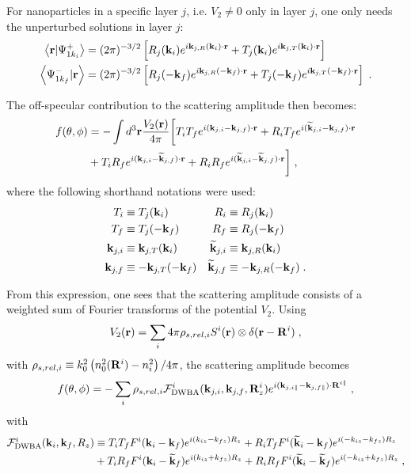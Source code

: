 For nanoparticles in a specific layer $j$, i.e. $V_2\neq0$ only in layer $j$, one only needs the unperturbed solutions in layer $j$:
\begin{align*}
  \left\langle \mathbf{r} \vert \Psi^+_{1k_i} \right\rangle &= (2\pi)^{-3/2}\left[ R_j(\mathbf{k}_i) e^{i \mathbf{k}_{j,R}(\mathbf{k}_i)\cdot\mathbf{r}} + T_j(\mathbf{k}_i) e^{i \mathbf{k}_{j,T}(\mathbf{k}_i)\cdot\mathbf{r}} \right] \\
  \left\langle \Psi^-_{1k_f} \vert \mathbf{r} \right\rangle &= (2\pi)^{-3/2}\left[ R_j(-\mathbf{k}_f) e^{i \mathbf{k}_{j,R}(-\mathbf{k}_f)\cdot\mathbf{r}} + T_j(-\mathbf{k}_f) e^{i \mathbf{k}_{j,T}(-\mathbf{k}_f)\cdot\mathbf{r}} \right] \; .
\end{align*}

The off-specular contribution to the scattering amplitude then becomes:
\begin{align*}
  f(\theta, \phi) &= -\int d^3\mathbf{r} \frac{V_2(\mathbf{r})}{4\pi} \biggl[ T_iT_fe^{i(\mathbf{k}_{j,i}-\mathbf{k}_{j,f})\cdot\mathbf{r}} + R_iT_fe^{i(\mathbf{\widetilde{k}}_{j,i}-\mathbf{k}_{j,f})\cdot\mathbf{r}} \\
   & + T_iR_fe^{i(\mathbf{k}_{j,i}-\mathbf{\widetilde{k}}_{j,f})\cdot\mathbf{r}} + R_iR_fe^{i(\mathbf{\widetilde{k}}_{j,i}-\mathbf{\widetilde{k}}_{j,f})\cdot\mathbf{r}} \biggr] \; ,
\end{align*}
where the following shorthand notations were used:
\begin{align*}
  T_i &\equiv  T_j(\mathbf{k}_i) & R_i &\equiv  R_j(\mathbf{k}_i)  \\
  T_f &\equiv  T_j(-\mathbf{k}_f) & R_f &\equiv  R_j(-\mathbf{k}_f) \\
  \mathbf{k}_{j,i} &\equiv \mathbf{k}_{j,T}(\mathbf{k}_i) & \mathbf{\widetilde{k}}_{j,i} &\equiv \mathbf{k}_{j,R}(\mathbf{k}_i)  \\
  \mathbf{k}_{j,f} &\equiv -\mathbf{k}_{j,T}(-\mathbf{k}_f) & \mathbf{\widetilde{k}}_{j,f} &\equiv -\mathbf{k}_{j,R}(-\mathbf{k}_f) \; .
\end{align*}

From this expression, one sees that the scattering amplitude consists of a weighted sum of Fourier transforms of the potential $V_2$. Using
\begin{equation*}
  V_2(\mathbf{r}) = \sum_i 4\pi \rho_{s,rel,i} S^i(\mathbf{r}) \otimes \delta(\mathbf{r} - \mathbf{R}^i) \; ,
\end{equation*}
with $\rho_{s,rel,i}\equiv  k_0^2\left( n_0^2(\mathbf{R}^i) - n_i^2 \right)/4\pi$, the scattering amplitude becomes
\begin{equation*}
  f(\theta, \phi) = -\sum_i  \rho_{s,rel,i} \mathcal{F}^i_{\text{DWBA}}(\mathbf{k}_{j,i},\mathbf{k}_{j,f},\mathbf{R}^i_z)e^{i(\mathbf{k}_{j,i\parallel}-\mathbf{k}_{j,f\parallel})\cdot \mathbf{R}^{i\parallel} } \; ,
\end{equation*}
with
\begin{align*}
  \mathcal{F}^i_\text{DWBA}(\mathbf{k}_i,\mathbf{k}_f,R_z) & \equiv T_iT_fF^i(\mathbf{k}_i-\mathbf{k}_f)e^{i(k_{iz}-k_{fz})R_z} + R_iT_fF^i(\mathbf{\widetilde{k}}_i-\mathbf{k}_f)e^{i(-k_{iz}-k_{fz})R_z} \\
  & + T_iR_fF^i(\mathbf{k}_i-\mathbf{\widetilde{k}}_f)e^{i(k_{iz}+k_{fz})R_z} + R_iR_fF^i(\mathbf{\widetilde{k}}_i-\mathbf{\widetilde{k}}_f)e^{i(-k_{iz}+k_{fz})R_z} \; ,
\end{align*}

